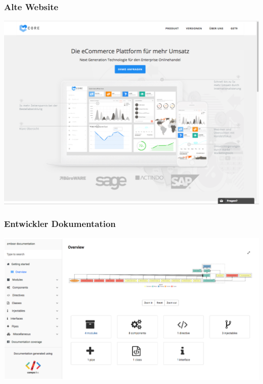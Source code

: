 \documentclass[11pt,a4paper]{article}
\begin{document}
\begin{appendices}
\subsubsection{Alte Website}
\includegraphics[scale=0.3]{getcore}
\subsubsection{Entwickler Dokumentation}
\label{sec:doku}
\includegraphics[scale=0.3]{compodoc}

\end{appendices}
\end{document}
